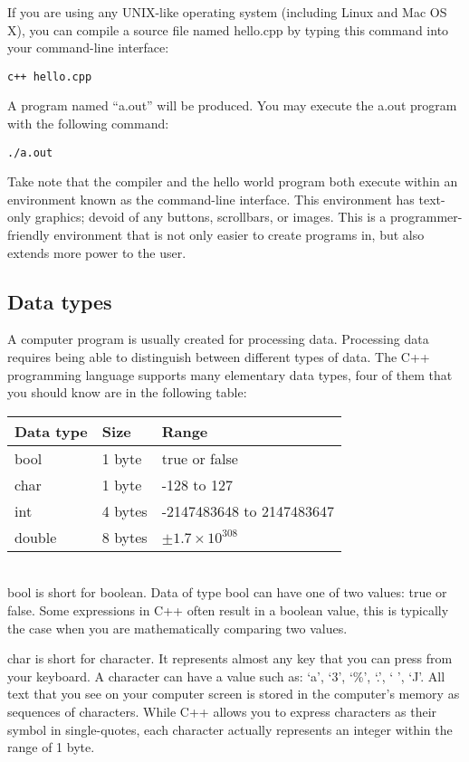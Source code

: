 \documentclass[a4paper,12pt]{article}
\begin{document}
If you are using any UNIX-like operating system (including Linux and Mac OS X), you can compile a source file named hello.cpp by typing this command into your command-line interface:
\begin{lstlisting}
c++ hello.cpp
\end{lstlisting}
A program named ``a.out'' will be produced.  You may execute the a.out program with the following command:
\begin{lstlisting}
./a.out
\end{lstlisting}

Take note that the compiler and the hello world program both execute within an environment known as the command-line interface. This environment has text-only graphics; devoid of any buttons, scrollbars, or images. This is a programmer-friendly environment that is not only easier to create programs in, but also extends more power to the user. 

\subsection*{Data types}

A computer program is usually created for processing data. Processing data requires being able to distinguish between different types of data. The C++ programming language supports many elementary data types, four of them that you should know are in the following table: \\

\begin{tabular}{|l|l|l|}
\hline
{\bf Data type} & {\bf Size} & {\bf Range} \\
\hline
bool & 1 byte & true or false \\
\hline
char & 1 byte & -128 to 127 \\
\hline
int & 4 bytes & -2147483648 to 2147483647 \\
\hline
double & 8 bytes & $\pm1.7 \times 10^{308}$ \\
\hline
\end{tabular} \\

bool is short for boolean. Data of type bool can have one of two values: true or false. Some expressions in C++ often result in a boolean value, this is typically the case when you are mathematically comparing two values.

char is short for character. It represents almost any key that you can press from your keyboard. A character can have a value such as: `a', `3', `\%', `.', ` ', `J'. All text that you see on your computer screen is stored in the computer's memory as sequences of characters. While C++ allows you to express characters as their symbol in single-quotes, each character actually represents an integer within the range of 1 byte.
\end{document}
